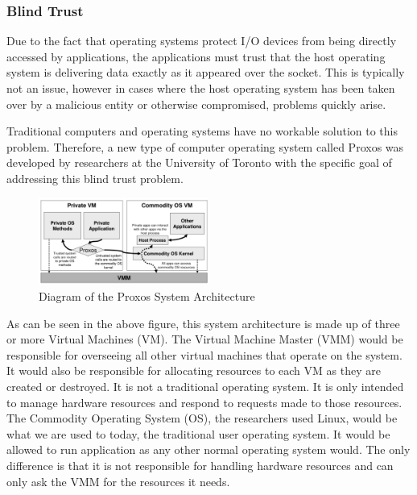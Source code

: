\documentclass[conference, 12pt]{IEEEtran}
\begin{document}
\subsubsection{Blind Trust}
Due to the fact that operating systems protect I/O devices from being directly accessed by applications, the applications must trust that the host operating system is delivering data exactly as it appeared over the socket\cite{Richard}. This is typically not an issue, however in cases where the host operating system has been taken over by a malicious entity or otherwise compromised, problems quickly arise.

Traditional computers and operating systems have no workable solution to this problem. Therefore, a new type of computer operating system called Proxos was developed by researchers at the University of Toronto with the specific goal of addressing this blind trust problem.

\begin{figure}[htbp]
    \centering
    \centerline{\includegraphics[width=0.5\textwidth]{Figure1.png}}
    \caption{Diagram of the Proxos System Architecture \cite{Richard}}
    \label{Figure1}
\end{figure}

As can be seen in the above figure, this system architecture is made up of three or more Virtual Machines (VM). The Virtual Machine Master (VMM) would be responsible for overseeing all other virtual machines that operate on the system. It would also be responsible for allocating resources to each VM as they are created or destroyed\cite{Richard}. It is not a traditional operating system. It is only intended to manage hardware resources and respond to requests made to those resources. The Commodity Operating System (OS), the researchers used Linux, would be what we are used to today, the traditional user operating system. It would be allowed to run application as any other normal operating system would. The only difference is that it is not responsible for handling hardware resources and can only ask the VMM for the resources it needs\cite{Richard}.
\end{document}
